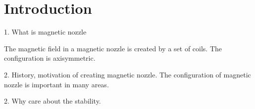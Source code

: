 \chapter{Introduction}
1. What is magnetic nozzle 

The magnetic field in a magnetic nozzle is created by a set of coils. The configuration is axisymmetric.

2. History, motivation of creating magnetic nozzle.
The configuration of magnetic nozzle is important in many areas.
\cite{smolyakov_quasineutral_2021}


2. Why care about the stability.

